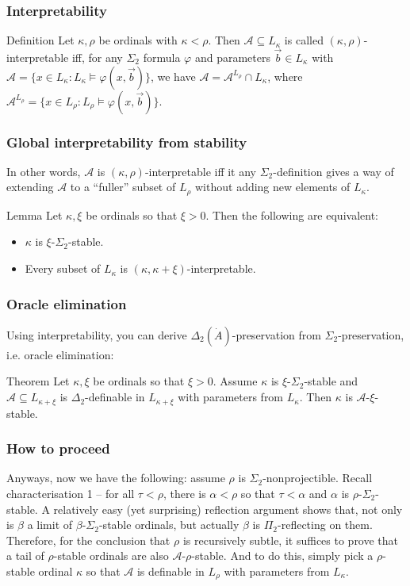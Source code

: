 \documentclass{beamer}
\begin{document}
\begin{frame}
\frametitle{Interpretability}
\begin{block}{Definition}
Let $\kappa, \rho$ be ordinals with $\kappa < \rho$. Then $\mathcal{A} \subseteq L_\kappa$ is called $(\kappa, \rho)$-interpretable iff, for any $\Sigma_2$ formula $\varphi$ and parameters $\vec{b} \in L_\kappa$ with $\mathcal{A} = \{x \in L_\kappa: L_\kappa \models \varphi(x, \vec{b})\}$, we have $\mathcal{A} = \mathcal{A}^{L_\rho} \cap L_\kappa$, where $\mathcal{A}^{L_\rho} = \{x \in L_\rho: L_\rho \models \varphi(x, \vec{b})\}$.
\end{block}
\end{frame}

\begin{frame}
\frametitle{Global interpretability from stability}
In other words, $\mathcal{A}$ is $(\kappa, \rho)$-interpretable iff it any $\Sigma_2$-definition gives a way of extending $\mathcal{A}$ to a ``fuller'' subset of $L_\rho$ without adding new elements of $L_\kappa$.

\begin{block}{Lemma}
Let $\kappa, \xi$ be ordinals so that $\xi > 0$. Then the following are equivalent:

\begin{itemize}
    \item $\kappa$ is $\xi$-$\Sigma_2$-stable.
    \item Every subset of $L_\kappa$ is $(\kappa, \kappa+\xi)$-interpretable.
\end{itemize}
\end{block}
\end{frame}

\begin{frame}
\frametitle{Oracle elimination}
Using interpretability, you can derive $\Delta_2(\dot{A})$-preservation from $\Sigma_2$-preservation, i.e. oracle elimination:

\begin{block}{Theorem}
Let $\kappa, \xi$ be ordinals so that $\xi > 0$. Assume $\kappa$ is $\xi$-$\Sigma_2$-stable and $\mathcal{A} \subseteq L_{\kappa+\xi}$ is $\Delta_2$-definable in $L_{\kappa+\xi}$ with parameters from $L_\kappa$. Then $\kappa$ is $\mathcal{A}$-$\xi$-stable.
\end{block}

\end{frame}

\begin{frame}
\frametitle{How to proceed}
Anyways, now we have the following: assume $\rho$ is $\Sigma_2$-nonprojectible. Recall characterisation 1 -- for all $\tau < \rho$, there is $\alpha < \rho$ so that $\tau < \alpha$ and $\alpha$ is $\rho$-$\Sigma_2$-stable. A relatively easy (yet surprising) reflection argument shows that, not only is $\beta$ a limit of $\beta$-$\Sigma_2$-stable ordinals, but actually $\beta$ is $\Pi_2$-reflecting on them. Therefore, for the conclusion that $\rho$ is  recursively subtle, it suffices to prove that a tail of $\rho$-stable ordinals are also $\mathcal{A}$-$\rho$-stable. And to do this, simply pick a $\rho$-stable ordinal $\kappa$ so that $\mathcal{A}$ is definable in $L_\rho$ with parameters from $L_\kappa$.
\end{frame}
\end{document}
